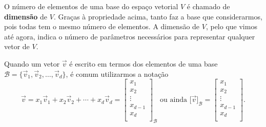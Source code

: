 \documentclass[../livro.tex]{subfiles}  %
\begin{document}
O número de elementos de uma base do espaço vetorial $V$ é chamado de \textbf{dimensão} de $V$. Graças à propriedade acima, tanto faz a base que considerarmos, pois todas tem o mesmo número de elementos. A dimensão de $V$, pelo que vimos até agora, indica o número de parâmetros necessários para representar qualquer vetor de $V$.

Quando um vetor $\vec{v}$ é escrito em termos dos elementos de uma base $\mathcal{B} = \{\vec{v}_1, \vec{v}_2, \dots, \vec{v}_d\}$, é comum utilizarmos a notação
\begin{equation}
\vec{v} = x_1 \vec{v}_1 + x_2 \vec{v}_2 + \cdots  + x_d \vec{v}_d =
\left[
\begin{array}{c}
x_1 \\
x_2 \\
\vdots \\
x_{d-1} \\
x_d \\
\end{array}
\right]_{\mathcal{B}} \text{ ou ainda } \big[ \vec{v} \big]_{\mathcal{B}} =
\left[
\begin{array}{c}
x_1 \\
x_2 \\
\vdots \\
x_{d-1} \\
x_d \\
\end{array}
\right].
\end{equation}
\end{document}
